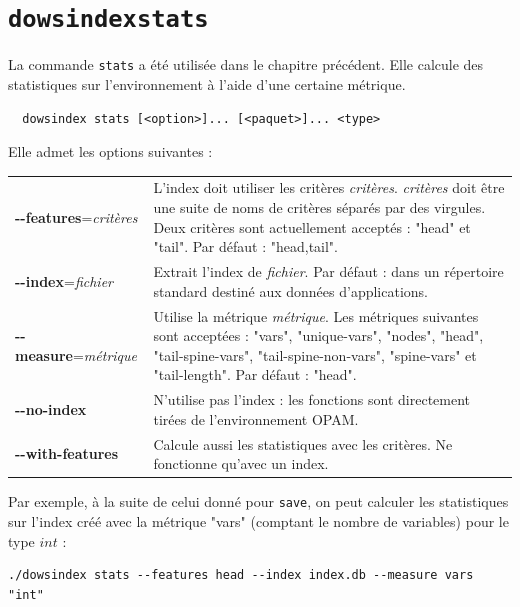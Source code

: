 \documentclass[a4paper]{report}
\theoremstyle{definition}
\newcommand{\dowsindex}{\texttt{dowsindex}\xspace}
\begin{document}
\section{\dowsindex \texttt{stats}}

La commande \texttt{stats} a été utilisée dans le chapitre précédent. Elle calcule des statistiques sur l'environnement à l'aide d'une certaine métrique.

\begin{center}
  \begin{verbatim}
  dowsindex stats [<option>]... [<paquet>]... <type>
  \end{verbatim}
\end{center}

Elle admet les options suivantes :

\begin{table}[h]
  \begin{tabularx}{\textwidth}{lX}
      \textbf{-{}-features}=\textit{critères} &
      L'index doit utiliser les critères \textit{critères}. \textit{critères} doit être une suite de noms de critères séparés par des virgules. Deux critères sont actuellement acceptés : "head" et "tail". Par défaut : "head,tail".
    \\
      \textbf{-{}-index}=\textit{fichier} &
      Extrait l'index de \textit{fichier}. Par défaut : dans un répertoire standard destiné aux données d'applications.
    \\
      \textbf{-{}-measure}=\textit{métrique} &
      Utilise la métrique \textit{métrique}. Les métriques suivantes sont acceptées : "vars", "unique-vars", "nodes", "head", "tail-spine-vars", "tail-spine-non-vars", "spine-vars" et "tail-length". Par défaut : "head".
    \\
      \textbf{-{}-no-index} &
      N'utilise pas l'index : les fonctions sont directement tirées de l'environnement OPAM.
    \\
      \textbf{-{}-with-features} &
      Calcule aussi les statistiques avec les critères. Ne fonctionne qu'avec un index.
  \end{tabularx}
\end{table}

Par exemple, à la suite de celui donné pour \texttt{save}, on peut calculer les statistiques sur l'index créé avec la métrique "vars" (comptant le nombre de variables) pour le type $int$ :

\begin{verbatim}
./dowsindex stats --features head --index index.db --measure vars "int"
\end{verbatim}
\end{document}
